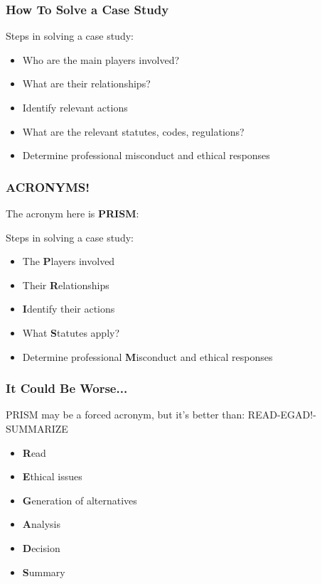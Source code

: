\begin{frame}
\frametitle{How To Solve a Case Study}

Steps in solving a case study:

\begin{itemize}
	\item Who are the main players involved?
	\item What are their relationships?
	\item Identify relevant actions
	\item What are the relevant statutes, codes, regulations?
	\item Determine professional misconduct and ethical responses
\end{itemize}


\end{frame}



\begin{frame}
\frametitle{ACRONYMS!}

The acronym here is \textbf{PRISM}:

Steps in solving a case study:
\begin{itemize}
	\item The \textbf{P}layers involved
	\item Their \textbf{R}elationships
	\item \textbf{I}dentify their actions
	\item What \textbf{S}tatutes apply?
	\item Determine professional \textbf{M}isconduct and ethical responses
\end{itemize}

\end{frame}



\begin{frame}
\frametitle{It Could Be Worse...}

PRISM may be a forced acronym, but it's better than:
READ-EGAD!-SUMMARIZE

\begin{itemize}
	\item \textbf{R}ead
	\item \textbf{E}thical issues
	\item \textbf{G}eneration of alternatives
	\item \textbf{A}nalysis
	\item \textbf{D}ecision
	\item \textbf{S}ummary
\end{itemize}

\end{frame}



